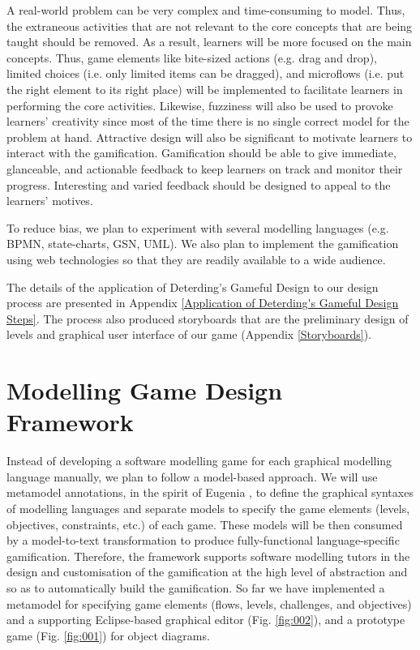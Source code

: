 \documentclass[12pt, a4paper]{report}
\begin{document}
{A real-world problem can be very complex and time-consuming to model. Thus, the extraneous activities that are not relevant to the core concepts that are being taught should be removed. As a result, learners will be more focused on the main concepts. Thus, game elements like bite-sized actions (e.g. drag and drop), limited choices (i.e. only limited items can be dragged), and microflows (i.e. put the right element to its right place) will be implemented to facilitate learners in performing the core activities. Likewise, fuzziness will also be used to provoke learners' creativity since most of the time there is no single correct model for the problem at hand. Attractive design will also be significant to motivate learners to interact with the gamification. Gamification should be able to give immediate, glanceable, and actionable feedback to keep learners on track and monitor their progress. Interesting and varied feedback should be designed to appeal to the learners' motives. 

To reduce bias, we plan to experiment with several modelling languages (e.g. BPMN, state-charts, GSN, UML). We also plan to implement the gamification using web technologies so that they are readily available to a wide audience.

The details of the application of Deterding's Gameful Design to our design process are presented in Appendix \ref{Application of Deterding's Gameful Design Steps}. The process also produced storyboards that are the preliminary design of levels and graphical user interface of our game (Appendix \ref{Storyboards}).      

\section{Modelling Game Design Framework}
Instead of developing a software modelling game for each graphical modelling language manually, we plan to follow a model-based approach. We will use metamodel annotations, in the spirit of Eugenia \cite{kolovos2015eugenia}, to define the graphical syntaxes of modelling languages and separate models to specify the game elements (levels, objectives, constraints, etc.) of each game. These models will be then consumed by a model-to-text transformation to produce fully-functional language-specific gamification. Therefore, the framework supports software modelling tutors in the design and customisation of the gamification at the high level of abstraction and so as to automatically build the gamification. So far we have implemented a metamodel for specifying game elements (flows, levels, challenges, and objectives) and a supporting Eclipse-based graphical editor (Fig. \ref{fig:002}), and a prototype game (Fig. \ref{fig:001}) for object diagrams. 

}
\end{document}
